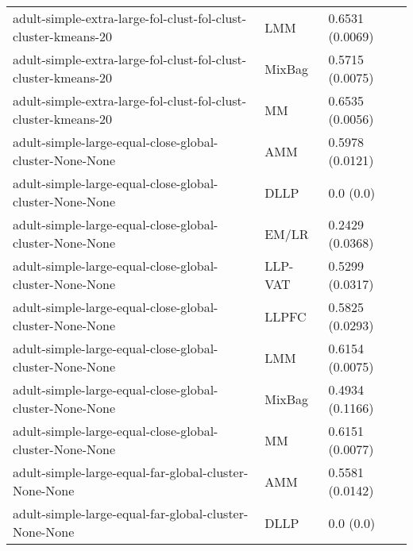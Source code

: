 \begin{longtable}{lll}
                                               adult-simple-extra-large-fol-clust-fol-clust-cluster-kmeans-20 &       LMM &                       0.6531 (0.0069) \\
                                               adult-simple-extra-large-fol-clust-fol-clust-cluster-kmeans-20 &    MixBag &                       0.5715 (0.0075) \\
                                               adult-simple-extra-large-fol-clust-fol-clust-cluster-kmeans-20 &        MM &                       0.6535 (0.0056) \\
                                                      adult-simple-large-equal-close-global-cluster-None-None &       AMM &                       0.5978 (0.0121) \\
                                                      adult-simple-large-equal-close-global-cluster-None-None &      DLLP &                             0.0 (0.0) \\
                                                      adult-simple-large-equal-close-global-cluster-None-None &     EM/LR &                       0.2429 (0.0368) \\
                                                      adult-simple-large-equal-close-global-cluster-None-None &   LLP-VAT &                       0.5299 (0.0317) \\
                                                      adult-simple-large-equal-close-global-cluster-None-None &     LLPFC &                       0.5825 (0.0293) \\
                                                      adult-simple-large-equal-close-global-cluster-None-None &       LMM &                       0.6154 (0.0075) \\
                                                      adult-simple-large-equal-close-global-cluster-None-None &    MixBag &                       0.4934 (0.1166) \\
                                                      adult-simple-large-equal-close-global-cluster-None-None &        MM &                       0.6151 (0.0077) \\
                                                        adult-simple-large-equal-far-global-cluster-None-None &       AMM &                       0.5581 (0.0142) \\
                                                        adult-simple-large-equal-far-global-cluster-None-None &      DLLP &                             0.0 (0.0) \\

\end{longtable}

